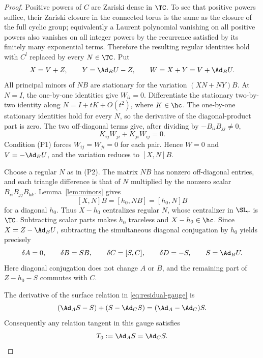 \begin{proof}
Positive powers of $C$ are Zariski dense in $\TC$. To see that positive
powers suffice, their Zariski closure in the connected torus is the same
as the closure of the full cyclic group; equivalently a Laurent
polynomial vanishing on all positive powers also vanishes on all integer
powers by the recurrence satisfied by its finitely many exponential
terms. Therefore the resulting regular identities hold with $C^l$
replaced by every $N\in\TC$.
Put
\[
 X=V+Z,\qquad Y=\Ad_BU-Z,\qquad W=X+Y=V+\Ad_BU.
\]
All principal minors of $NB$ are stationary for the variation
$(XN+NY)B$. At $N=I$, the one-by-one identities give $W_{ii}=0$.
Differentiate the stationary two-by-two identity along $N=I+tK+O(t^2)$,
where $K\in\hc$. The one-by-one stationary identities hold for every
$N$, so the derivative of the diagonal-product part is zero. The two
off-diagonal terms give, after dividing by $-B_{ii}B_{jj}\ne0$,
\begin{equation}\label{eq:pair-W}
 K_{ij}W_{ji}+K_{ji}W_{ij}=0.
\end{equation}
Condition (P1) forces $W_{ij}=W_{ji}=0$ for each pair. Hence $W=0$ and
$V=-\Ad_BU$, and the variation reduces to $[X,N]B$.

Choose a regular $N$ as in (P2). The matrix $NB$ has nonzero
off-diagonal entries, and each triangle difference is that of $N$
multiplied by the nonzero scalar $B_{ii}B_{jj}B_{kk}$.
Lemma~\ref{lem:minors} gives
\[
 [X,N]B=[h_0,NB]=[h_0,N]B
\]
for a diagonal $h_0$. Thus $X-h_0$ centralizes regular $N$, whose
centralizer in $\SL_r$ is $\TC$. Subtracting scalar parts makes
$h_0$ traceless and $X-h_0\in\hc$. Since $X=Z-\Ad_BU$, subtracting
the simultaneous diagonal conjugation by $h_0$ yields precisely
\begin{equation}\label{eq:residual-gauge}
 \delta A=0,\qquad \delta B=SB,\qquad
 \delta C=[S,C],\qquad \delta D=-S,
 \qquad S=\Ad_BU.
\end{equation}
Here diagonal conjugation does not change $A$ or $B$, and the remaining
part of $Z-h_0-S$ commutes with $C$.

The derivative of the surface relation in \eqref{eq:residual-gauge} is
\[
 (\Ad_A S-S)+(S-\Ad_C S)=(\Ad_A-\Ad_C)S.
\]
Consequently any relation tangent in this gauge satisfies
\begin{equation}\label{eq:T0}
 T_0:=\Ad_A S=\Ad_C S.
\end{equation}


\end{proof}
